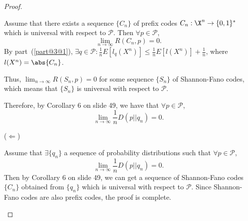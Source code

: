 \documentclass[
  coursecode={MTHE 477},
  assignmentname={Homework \homeworknumber},
  studentnumber=20053722,
  name={Bryan Hoang},
  draft,
]{
  ltxanswer%
}
\begin{document}
\begin{questions}
\begin{parts}
\begin{solution}
\begin{proof}
\begin{proofpart}
            Assume that there exists a sequence \(\{C_{n}\}\) of prefix codes \(C_{n}:\X^{n} \to \{0,1\}^{*}\) which is universal with respect to \(\mathcal{P}\). Then \(\forall p \in \mathcal{P}\),
            \begin{equation*}
              \lim_{n\to\infty} R(C_{n},p) = 0.
            \end{equation*}
            By part~(\ref{part@3@1}), \(\exists q \in \mathcal{P} : \frac{1}{n} E[l_{q}(X^{n})] \le \frac{1}{n} E[l(X^{n})] + \frac{1}{n}\), where \(l(X^{n}) = \abs{C_{n}}\).

            Thus, \(\lim_{n\to\infty} R(S_{n},p) = 0\) for some sequence \(\{S_{n}\}\) of Shannon-Fano codes, which means that \(\{S_{n}\}\) is universal with respect to \(\mathcal{P}\).

            Therefore, by Corollary 6 on slide 49, we have that \(\forall p \in \mathcal{P}\),
            \begin{equation*}
              \lim_{n\to\infty} \frac{1}{n}D(p||q_{n}) = 0.
            \end{equation*}
          \end{proofpart}

          \begin{proofpart}
            (\(\Leftarrow\))

            Assume that \(\exists \{q_{n}\}\) a sequence of probability distributions such that \(\forall p \in \mathcal{P}\),
            \begin{equation*}
              \lim_{n\to\infty} \frac{1}{n}D(p||q_{n}) = 0.
            \end{equation*}
            Then by Corollary 6 on slide 49, we can get a sequence of Shannon-Fano codes \(\{C_{n}\}\) obtained from \(\{q_{n}\}\) which is universal with respect to \(\mathcal{P}\). Since Shannon-Fano codes are also prefix codes, the proof is complete.
          \end{proofpart}
        \end{proof}
      \end{solution}
    \end{parts}
  \end{questions}
\end{document}
